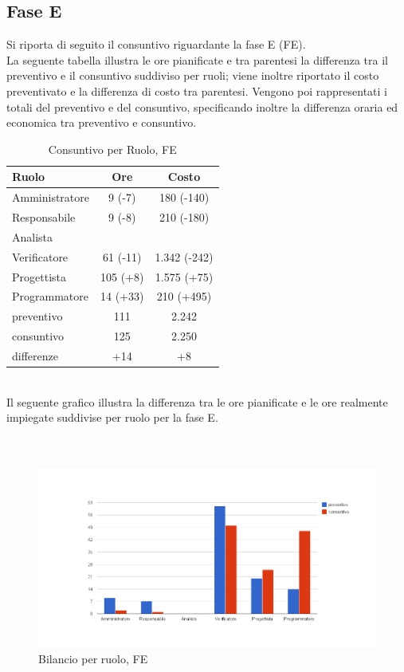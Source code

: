 \subsection{Fase E}
\label{consuntivoE}
	Si riporta di seguito il consuntivo riguardante la fase E (FE).
	\\ La seguente tabella illustra le ore pianificate e tra parentesi la differenza tra il preventivo e il consuntivo suddiviso per ruoli; viene inoltre riportato il costo preventivato e la differenza di costo tra parentesi. Vengono poi rappresentati i totali del preventivo e del consuntivo, specificando inoltre la differenza oraria ed economica tra preventivo e consuntivo.
	\begin{table}[!h]
		\centering
		\begin{tabular}{|l|c|c|}
			\hline
			Ruolo & Ore & Costo\\
			\hline
			Amministratore & 9 (-7) & 180 (-140)\\
			Responsabile & 9 (-8) & 210 (-180)\\
			Analista &  & \\
			Verificatore & 61 (-11) & 1.342 (-242)\\
			Progettista & 105 (+8) & 1.575 (+75)\\
			Programmatore & 14 (+33) & 210 (+495)\\	
			\hline
			preventivo & 111 & 2.242\\
			consuntivo & 125 & 2.250\\
			differenze & +14 & +8 \\
			\hline			
		\end{tabular}
		\caption{Consuntivo per Ruolo, FE}
	\end{table}
	\\Il seguente grafico illustra la differenza tra le ore pianificate e le ore realmente impiegate suddivise per ruolo per la fase E. \\ \\ \\
\begin{figure}[!h]
	\centering
	\includegraphics[width=1.2\textwidth] {./content/Immagini/consE.png}
	\caption{Bilancio per ruolo, FE}
	\label{bilE}
\end{figure}	 
